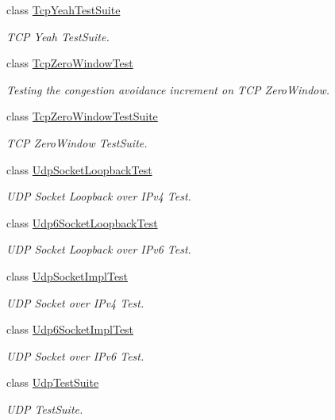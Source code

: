 \begin{DoxyCompactItemize}
class \hyperlink{classTcpYeahTestSuite}{Tcp\+Yeah\+Test\+Suite}
\begin{DoxyCompactList}\small\item\em T\+CP Yeah Test\+Suite. \end{DoxyCompactList}\item 
class \hyperlink{classTcpZeroWindowTest}{Tcp\+Zero\+Window\+Test}
\begin{DoxyCompactList}\small\item\em Testing the congestion avoidance increment on T\+CP Zero\+Window. \end{DoxyCompactList}\item 
class \hyperlink{classTcpZeroWindowTestSuite}{Tcp\+Zero\+Window\+Test\+Suite}
\begin{DoxyCompactList}\small\item\em T\+CP Zero\+Window Test\+Suite. \end{DoxyCompactList}\item 
class \hyperlink{classUdpSocketLoopbackTest}{Udp\+Socket\+Loopback\+Test}
\begin{DoxyCompactList}\small\item\em U\+DP Socket Loopback over I\+Pv4 Test. \end{DoxyCompactList}\item 
class \hyperlink{classUdp6SocketLoopbackTest}{Udp6\+Socket\+Loopback\+Test}
\begin{DoxyCompactList}\small\item\em U\+DP Socket Loopback over I\+Pv6 Test. \end{DoxyCompactList}\item 
class \hyperlink{classUdpSocketImplTest}{Udp\+Socket\+Impl\+Test}
\begin{DoxyCompactList}\small\item\em U\+DP Socket over I\+Pv4 Test. \end{DoxyCompactList}\item 
class \hyperlink{classUdp6SocketImplTest}{Udp6\+Socket\+Impl\+Test}
\begin{DoxyCompactList}\small\item\em U\+DP Socket over I\+Pv6 Test. \end{DoxyCompactList}\item 
class \hyperlink{classUdpTestSuite}{Udp\+Test\+Suite}
\begin{DoxyCompactList}\small\item\em U\+DP Test\+Suite. \end{DoxyCompactList}\end{DoxyCompactItemize}
